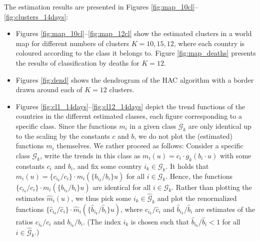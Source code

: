 \documentclass[a4paper,12pt]{article}
\numberwithin{equation}{section}
\begin{document}
The estimation results are presented in Figures \ref{fig:map_10cl}--\ref{fig:clusters_14days}:
\begin{itemize}[leftmargin=0.6cm]
\item Figures \ref{fig:map_10cl}--\ref{fig:map_12cl} show the estimated clusters in a world map for different numbers of clusters $K =10, 15, 12$, where each country is coloured according to the class it belongs to. Figure \ref{fig:map_deaths} presents the results of classification by deaths for $K =12$.
\item Figures \ref{fig:dend} shows the dendrogram of the HAC algorithm with a border drawn around each of $K = 12$ clusters.
\item Figures \ref{fig:cl1_14days}--\ref{fig:cl12_14days} depict the trend functions of the countries in the different estimated classes, each figure corresponding to a specific class. Since the functions $m_i$ in a given class $\mathcal{G}_k$ are only identical up to the scaling by the constants $c$ and $b$, we do not plot the (estimated) functions $m_i$ themselves. We rather proceed as follows: Consider a specific class $\mathcal{G}_k$,  write the trends in this class as $m_i(u) = c_i \cdot g_k(b_i \cdot u)$ with some constants $c_i$ and $b_i$, and fix some country $i_k \in \mathcal{G}_k$. It holds that $m_i(u) = \{ c_{i_k}/c_i \} \cdot m_i(\{ b_{i_k}/b_i \} u)$ for all $i \in \mathcal{G}_k$. Hence, the functions $\{ c_{i_k}/c_i \} \cdot m_i(\{ b_{i_k}/b_i \} u)$ are identical for all $i \in \mathcal{G}_k$. Rather than plotting the estimates $\hat{m}_i(u)$, we thus pick some $i_k \in \hat{\mathcal{G}}_k$ and plot the renormalized functions $\{ \hat{c}_{i_k}/\hat{c}_i \} \cdot \hat{m}_i(\{ \hat{b}_{i_k}/\hat{b}_i \} u)$, where $\hat{c}_{i_k}/\hat{c}_i$ and $\hat{b}_{i_k}/\hat{b}_i$ are estimates of the ratios $c_{i_k}/c_i$ and $b_{i_k}/b_i$. (The index $i_k$ is chosen such that $\hat{b}_{i_k}/\hat{b}_i < 1$ for all $i \in \hat{\mathcal{G}}_k$.)
\end{itemize}

\end{document}
